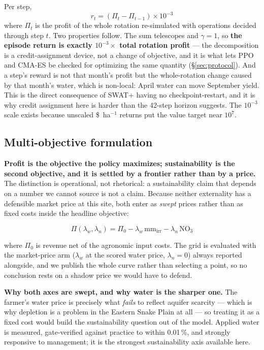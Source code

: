 \documentclass[a4paper,fleqn]{cas-sc}
\begin{document}
Per step,
\begin{equation}\label{eq:reward}
r_t = (\Pi_t - \Pi_{t-1}) \times 10^{-3}
\end{equation}
where $\Pi_t$ is the profit of the whole rotation re-simulated with operations decided
through step $t$. Two properties follow. The sum telescopes and $\gamma = 1$, so
\textbf{the episode return is exactly $10^{-3} \times$ total rotation profit} --- the
decomposition is a credit-assignment device, not a change of objective, and it is what
lets PPO and CMA-ES be checked for optimizing the same quantity
(\S\ref{sec:protocol}). And a step's reward is not that month's profit but the
whole-rotation change caused by that month's water, which is non-local: April water can
move September yield. This is the direct consequence of SWAT+ having no
checkpoint-restart, and it is why credit assignment here is harder than the 42-step
horizon suggests. The $10^{-3}$ scale exists because unscaled \$~ha$^{-1}$ returns put
the value target near $10^7$.

\subsection{Multi-objective formulation}\label{sec:multiobjective}

\textbf{Profit is the objective the policy maximizes; sustainability is the second
objective, and it is settled by a frontier rather than by a price.} The distinction is
operational, not rhetorical: a sustainability claim that depends on a number we cannot
source is not a claim. Because neither externality has a defensible market price at this
site, both enter as \emph{swept} prices rather than as fixed costs inside the headline
objective:

\begin{equation}\label{eq:frontier}
\Pi(\lambda_w, \lambda_n) = \Pi_0 - \lambda_w \, \mathrm{mm_{irr}} - \lambda_n \, \mathrm{NO_3}
\end{equation}

where $\Pi_0$ is revenue net of the agronomic input costs. The grid is evaluated with
the market-price arm ($\lambda_w$ at the scored water price, $\lambda_n = 0$) always
reported alongside, and we publish the whole curve rather than selecting a point, so no
conclusion rests on a shadow price we would have to defend.

\textbf{Why both axes are swept, and why water is the sharper one.} The farmer's water
price is precisely what \emph{fails} to reflect aquifer scarcity --- which is why
depletion is a problem in the Eastern Snake Plain at all --- so treating it as a fixed
cost would build the sustainability question out of the model. Applied water is
measured, gate-verified against practice to within 0.01\,\%, and strongly responsive to
management; it is the strongest sustainability axis available here.
\end{document}
